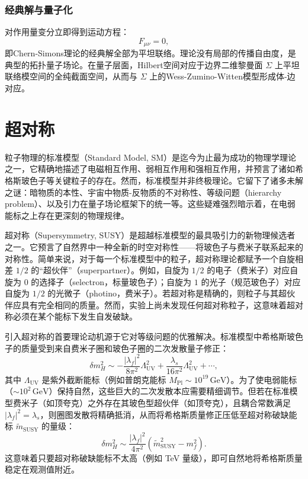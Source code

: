 \subsection*{经典解与量子化}

对作用量变分立即得到运动方程：
\begin{equation}
F_{\mu\nu} = 0,
\end{equation}
即Chern-Simons理论的经典解全部为平坦联络。理论没有局部的传播自由度，是典型的拓扑量子场论。在量子层面，Hilbert空间对应于边界二维黎曼面 $\Sigma$ 上平坦联络模空间的全纯截面空间，从而与 $\Sigma$ 上的Wess-Zumino-Witten模型形成体-边对应。



\chapter{超对称}
粒子物理的标准模型（Standard Model, SM）是迄今为止最为成功的物理学理论之一，它精确地描述了电磁相互作用、弱相互作用和强相互作用，并预言了诸如希格斯玻色子等关键粒子的存在。然而，标准模型并非终极理论。它留下了诸多未解之谜：暗物质的本性、宇宙中物质-反物质的不对称性、等级问题（hierarchy problem）、以及引力在量子场论框架下的统一等。这些疑难强烈暗示着，在电弱能标之上存在更深刻的物理规律。

超对称（Supersymmetry, SUSY）是超越标准模型的最具吸引力的新物理候选者之一。它预言了自然界中一种全新的时空对称性——将玻色子与费米子联系起来的对称性。简单来说，对于每一个标准模型中的粒子，超对称理论都赋予一个自旋相差 $1/2$ 的“超伙伴”（superpartner）。例如，自旋为 $1/2$ 的电子（费米子）对应自旋为 $0$ 的选择子（selectron，标量玻色子）；自旋为 $1$ 的光子（规范玻色子）对应自旋为 $1/2$ 的光微子（photino，费米子）。若超对称是精确的，则粒子与其超伙伴应具有完全相同的质量。然而，实验上尚未发现任何超对称粒子，这意味着超对称必须在某个能标下发生自发破缺。

引入超对称的首要理论动机源于它对等级问题的优雅解决。标准模型中希格斯玻色子的质量受到来自费米子圈和玻色子圈的二次发散量子修正：
\begin{equation}
\delta m_H^2 \sim -\frac{|\lambda_f|^2}{8\pi^2} \Lambda_{\text{UV}}^2 + \frac{\lambda_s}{16\pi^2} \Lambda_{\text{UV}}^2 + \cdots,
\end{equation}
其中 $\Lambda_{\text{UV}}$ 是紫外截断能标（例如普朗克能标 $M_{\text{Pl}} \sim 10^{19}\,\text{GeV}$）。为了使电弱能标（$\sim 10^2\,\text{GeV}$）保持自然，这些巨大的二次发散本应需要精细调节。但若在标准模型费米子（如顶夸克）之外存在其玻色型超伙伴（如顶夸克），且耦合常数满足 $|\lambda_f|^2 = \lambda_s$，则圈图发散将精确抵消，从而将希格斯质量修正压低至超对称破缺能标 $\tilde{m}_{\text{SUSY}}$ 的量级：
\begin{equation}
\delta m_H^2 \sim \frac{|\lambda_f|^2}{4\pi^2} \left( \tilde{m}_{\text{SUSY}}^2 - m_f^2 \right).
\end{equation}
这意味着只要超对称破缺能标不太高（例如 TeV 量级），即可自然地将希格斯质量稳定在观测值附近。

